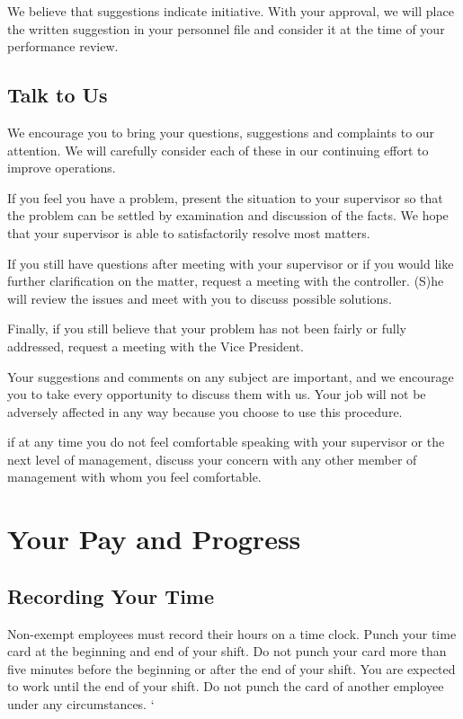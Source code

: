 We believe that suggestions indicate initiative. With your approval, we will place the written suggestion in your personnel file and consider it at the time of your performance review.

\subsection{Talk to Us}

We encourage you to bring your questions, suggestions and complaints to our attention. We will carefully consider each of these in our continuing effort to improve operations.

If you feel you have a problem, present the situation to your supervisor so that the problem can be settled by examination and discussion of the facts. We hope that your supervisor is able to satisfactorily resolve most matters.

If you still have questions after meeting with your supervisor or if you would like further clarification on the matter, request a meeting with the controller. (S)he will review the issues and meet with you to discuss possible solutions.

Finally, if you still believe that your problem has not been fairly or fully addressed, request a meeting with the Vice President.

Your suggestions and comments on any subject are important, and we encourage you to take every opportunity to discuss them with us. Your job will not be adversely affected in any way because you choose to use this procedure.

if at any time you do not feel comfortable speaking with your supervisor or the next level of management, discuss your concern with any other member of management with whom you feel comfortable.

\section{Your Pay and Progress}

\subsection{Recording Your Time}

Non-exempt employees must record their hours on a time clock. Punch your time card at the beginning and end of your shift. Do not punch your card more than five minutes before the beginning or after the end of your shift. You are expected to work until the end of your shift. Do not punch the card of another employee under any circumstances. ‘


